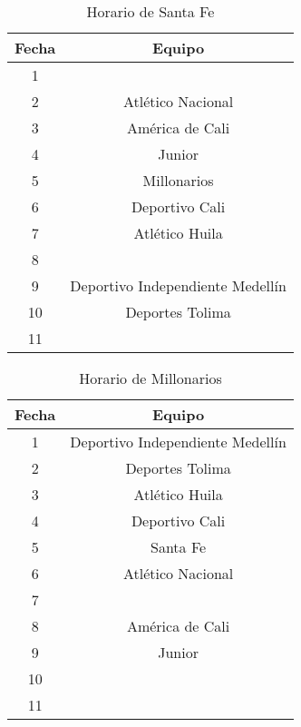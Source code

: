 \documentclass[11pt]{article}
\begin{document}
\begin{multicols}{2}
            \begin{table}[H]
                \centering
                \begin{tabular}{|c||c|}
                    \hline
                    Fecha & Equipo\\ \hline
                    1 &  \\ \hline
                    2 & Atlético Nacional \\ \hline
                    3 & América de Cali \\ \hline
                    4 & Junior \\ \hline
                    5 & Millonarios \\ \hline
                    6 & Deportivo Cali \\ \hline
                    7 & Atlético Huila \\ \hline
                    8 &  \\ \hline
                    9 & Deportivo Independiente Medellín \\ \hline
                    10 & Deportes Tolima  \\ \hline
                    11 &  \\ \hline
                \end{tabular} 
                \caption{Horario de Santa Fe}
            \end{table}

            \begin{table}[H]
                \centering
                \begin{tabular}{|c||c|}
                    \hline
                    Fecha & Equipo\\ \hline
                    1 & Deportivo Independiente Medellín \\ \hline
                    2 & Deportes Tolima  \\ \hline
                    3 & Atlético Huila \\ \hline
                    4 & Deportivo Cali \\ \hline
                    5 & Santa Fe \\ \hline
                    6 & Atlético Nacional \\ \hline
                    7 &  \\ \hline
                    8 & América de Cali \\ \hline
                    9 & Junior \\ \hline
                    10 &  \\ \hline
                    11 &  \\ \hline
                \end{tabular} 
                \caption{Horario de Millonarios}
            \end{table}


\end{multicols}
\end{document}
